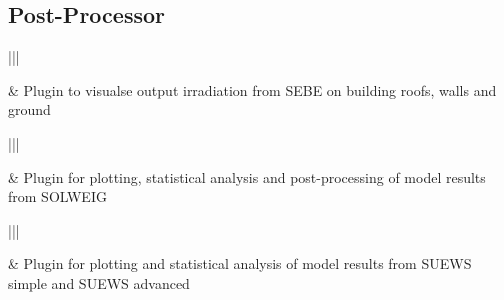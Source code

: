 \documentclass[letterpaper,10pt,english]{sphinxmanual}
\begin{document}
\subsection{Post-Processor}
\label{\detokenize{Introduction:post-processor}}


\begin{savenotes}\sphinxattablestart
\centering
\begin{tabular}[t]{|||}
\hline

{\hyperref[\detokenize{post_processor/Solar Radiation SEBE (Visualisation):sebevisualisation}]{}}
&
Plugin to visualse output irradiation from SEBE on building roofs, walls and ground
\\
\hline
\end{tabular}
\par
\sphinxattableend\end{savenotes}



\begin{savenotes}\sphinxattablestart
\centering
\begin{tabular}[t]{|||}
\hline

{\hyperref[\detokenize{post_processor/Outdoor Thermal Comfort SOLWEIG Analyzer:solweiganalyzer}]{}}
&
Plugin for plotting, statistical analysis and post-processing of model results from SOLWEIG
\\
\hline
\end{tabular}
\par
\sphinxattableend\end{savenotes}



\begin{savenotes}\sphinxattablestart
\centering
\begin{tabular}[t]{|||}
\hline

{\hyperref[\detokenize{post_processor/Urban Energy Balance SUEWS Analyser:suewsanalyser}]{}}
&
Plugin for plotting and statistical analysis of model results from SUEWS simple and SUEWS advanced
\\
\hline
\end{tabular}
\par
\sphinxattableend\end{savenotes}
\end{document}
